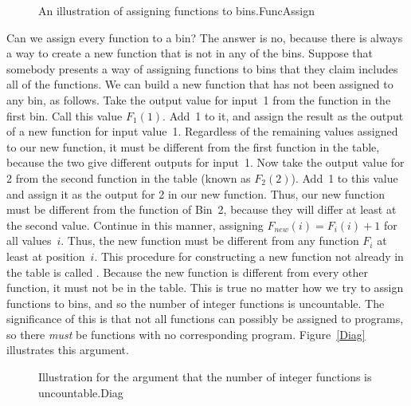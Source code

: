 \begin{figure}
\vspace{-\bigskipamount}\vspace{-\bigskipamount}
{An illustration of assigning functions to bins.}{FuncAssign}
\end{figure}

Can we assign every function to a bin?
The answer is no, because there is always a way to create a new
function that is not in any of the bins.
Suppose that somebody presents a way of assigning functions to bins
that they claim includes all of the functions.
We can build a new function that has not been assigned to any bin, as
follows.
Take the output value for input~1 from the function in the first bin.
Call this value \(F_1(1)\).
Add~1 to it, and assign the result as the output of a new
function for input value~1.
Regardless of the remaining values assigned to our new function, it
must be different from the first function in the table, because the
two give different outputs for input~1.
Now take the output value for 2 from the second function in the table
(known as \(F_2(2)\)).
Add~1 to this value and assign it as the output for 2 in our new
function.
Thus, our new function must be different from the function of Bin~2,
because they will differ at least at the second value.
Continue in this manner, assigning \(F_{new}(i) = F_i(i) + 1\) for all
values~\(i\).
Thus, the new function must be different from any function \(F_i\) at
least at position~\(i\).
This procedure for constructing a new function not already in the
table is called .
Because the new function is different from every other function, it
must not be in the table.
This is true no matter how we try to assign functions to
bins, and so the number of integer functions is uncountable.
The significance of this is that not all functions can possibly be
assigned to programs, so there \emph{must} be functions with no
corresponding program.
Figure~\ref{Diag} illustrates this argument.

\begin{figure}
\vspace{-\bigskipamount}\vspace{-\medskipamount}
{Illustration for the argument that the number of integer functions
is uncountable.}{Diag}
\end{figure}

